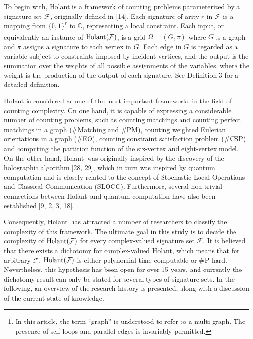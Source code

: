 \documentclass[10pt,a4paper]{article}
\begin{document}
To begin with, Holant is a framework of counting problems parameterized by a signature set $\mathcal{F}$, originally defined in [14]. Each signature of arity $r$ in $\mathcal{F}$ is a mapping from $\{0,1\}^{r}$ to $\mathbb{C}$, representing a local constraint. Each input, or equivalently an instance of $\textup{{Holant}}(\mathcal{F})$, is a grid $\Omega=(G,\pi)$ where $G$ is a graph\footnote{In this article, the term “graph” is understood to refer to a multi-graph. The presence of self-loops and parallel edges is invariably permitted.} and $\pi$ assigns a signature to each vertex in $G$. Each edge in $G$ is regarded as a variable subject to constraints imposed by incident vertices, and the output is the summation over the weights of all possible assignments of the variables, where the weight is the production of the output of each signature. See Definition 3 for a detailed definition.\par




Holant is considered as one of the most important frameworks in the field of counting complexity. On one hand, it is capable of expressing a considerable number of counting problems, such as counting matchings and counting perfect matchings in a graph (\#Matching and \#PM), counting weighted Eulerian orientations in a graph (\#EO), counting constraint satisfaction problem (\#CSP) and computing the partition function of the six-vertex and eight-vertex model. On the other hand, Holant was originally inspired by the discovery of the holographic algorithm [28, 29], which in turn was inspired by quantum computation and is closely related to the concept of Stochastic Local Operations and Classical Communication (SLOCC). Furthermore, several non-trivial connections between Holant and quantum computation have also been established [9, 2, 3, 18].\par




Consequently, Holant has attracted a number of researchers to classify the complexity of this framework. The ultimate goal in this study is to decide the complexity of $\textup{{Holant}}(\mathcal{F})$ for every complex-valued signature set $\mathcal{F}$. It is believed that there exists a dichotomy for complex-valued Holant, which means that for arbitrary $\mathcal{F}$, $\textup{{Holant}}(\mathcal{F})$ is either polynomial-time computable or \#P-hard. Nevertheless, this hypothesis has been open for over 15 years, and currently the dichotomy result can only be stated for several types of signature sets. In the following, an overview of the research history is presented, along with a discussion of the current state of knowledge.\par
\end{document}
